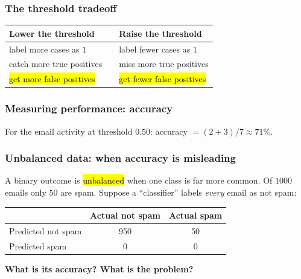 \documentclass[slidestop,compress,mathserif]{beamer}
\begin{document}
\begin{frame}
\frametitle{The threshold tradeoff}

\begin{center}
\begin{tabular}{l c l}
\toprule
\textbf{Lower the threshold} & & \textbf{Raise the threshold} \\
\midrule
label more cases as $1$ &  &label fewer cases as $1$ \\
catch more true positives & & miss more true positives \\
\hl{get more false positives} & & \hl{get fewer false positives} \\
\bottomrule
\end{tabular}
\end{center}

\vspace{0.5em}

\end{frame}
\begin{frame}
\frametitle{Measuring performance: accuracy}


For the email activity at threshold $0.50$: accuracy $=(2+3)/7\approx 71\%$.

\end{frame}
\begin{frame}
\frametitle{Unbalanced data: when accuracy is misleading}

A binary outcome is \hl{unbalanced} when one class is far more common. Of $1000$ emails only $50$ are spam. Suppose a ``classifier'' labels \emph{every} email as not spam:

{\footnotesize
\begin{center}
\begin{tabular}{lcc}
\toprule
 & Actual not spam & Actual spam \\
\midrule
Predicted not spam & 950 & 50 \\
Predicted spam & 0 & 0 \\
\bottomrule
\end{tabular}
\end{center}}

\vspace{-0.3em}
\textbf{What is its accuracy? What is the problem?}

\pause
\vspace{-0.2em}

\end{frame}
\end{document}
